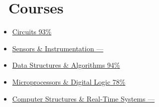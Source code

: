 \documentclass{resume}
\begin{document}
\section{\faBook\ Courses}
\begin{itemize}
\item \href{http://www.ucalendar.uwaterloo.ca/1516/COURSE/course-MTE.html#MTE120}{Circuits \hfill 93\%} \par
\item \href{http://www.ucalendar.uwaterloo.ca/1516/COURSE/course-MTE.html#MTE220}{Sensors \& Instrumentation \hfill ---}\par
\item \href{http://www.ucalendar.uwaterloo.ca/1516/COURSE/course-MTE.html#MTE140}{Data Structures \& Algorithms \hfill 94\%} \par
\item \href{http://www.ucalendar.uwaterloo.ca/1516/COURSE/course-MTE.html#MTE262}{Microprocessors \& Digital Logic \hfill 78\%}\par
\item \href{http://www.ucalendar.uwaterloo.ca/1516/COURSE/course-MTE.html#MTE241}{Computer Structures \& Real-Time Systems \hfill ---}
\end{itemize}
\nspace{}
\end{document}
